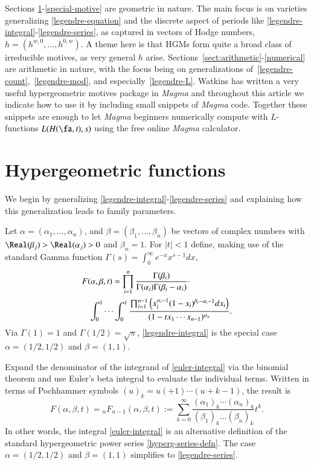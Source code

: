 \documentclass{notices}
\numberwithin{equation}{section}
\numberwithin{table}{section}
\numberwithin{figure}{section}
\begin{document}
Sections \ref{monodromy}-\ref{special-motive} are geometric in nature.  The main focus is 
on varieties generalizing \eqref{legendre-equation} 
and the discrete aspect of periods like \eqref{legendre-integral}-\eqref{legendre-series},
as captured in vectors of 
Hodge numbers, $h = (h^{w,0},\dots,h^{0,w})$.  
A theme here is that HGMs form quite a broad class of
irreducible motives, as very general $h$ arise.   
 Sections~\ref{sect:arithmetic}-\ref{numerical} are 
arithmetic in nature, with the focus being on
generalizations of~\eqref{legendre-count},~\eqref{legendre-mod},
and especially~\eqref{legendre-L}.   Watkins 
has written a very useful hypergeometric motives package \cite{Wat}
in {\em Magma} and throughout this article we indicate
how to use it by including small snippets of {\em Magma} code.
Together these snippets are enough to let {\em Magma}
beginners numerically compute with $L$-functions $L(H(\fa,t),s)$ using the
free online {\em Magma} calculator. 


\section{Hypergeometric functions}
\label{monodromy}
We begin by generalizing \eqref{legendre-integral}-\eqref{legendre-series} and explaining how
this generalization leads to family parameters.  

 Let $\alpha = (\alpha_1, \dots, \alpha_n)$, 
and $\beta = (\beta_1, \dots, \beta_n)$ be vectors of complex numbers
with $\Real(\beta_j)>\Real(\alpha_j)>0$ and $\beta_n=1$.  For $|t| < 1$ define, making use of the
standard Gamma function
$\Gamma(s) = \int_0^\infty e^{-x} x^{s-1} dx$, 
\begin{eqnarray}
\label{euler-integral}
\lefteqn{F(\alpha,\beta,t)=  \prod_{i=1}^n\frac{\Gamma(\beta_i)}{\Gamma(\alpha_i)\Gamma(\beta_i-\alpha_i)} \cdot} \\
&& \int_0^1\cdots\int_0^1  \frac{\prod_{i=1}^{n-1} \left( x_i^{\alpha_i-1}(1-x_i)^{\beta_i-\alpha_i-1}  dx_i \right)}{ (1-tx_1\cdots x_{n-1})^{\alpha_n}}. \nonumber
\end{eqnarray}
Via $\Gamma(1)=1$ and $\Gamma(1/2) = \sqrt{\pi}$,  \eqref{legendre-integral} is the special case $\alpha = (1/2,1/2)$ and $\beta=(1,1)$.

Expand the denominator of the integrand of \eqref{euler-integral} via the binomial theorem and use
Euler's beta integral to evaluate the individual terms.  Written in terms 
of Pochhammer symbols $(u)_k 
= u(+1) \cdots (u+k-1)$, the result is
\begin{equation}
\label{hyperg-series-defn}
F (\alpha,\beta,t) = {}_{n}F_{n-1} (\alpha,\beta,t):=
   \sum_{k = 0}^\infty \frac{(\alpha_1)_k \cdots (\alpha_n)_k}{(\beta_1)_k\dots
  (\beta_n)_k} t^k.
\end{equation}
In other words, the integral \eqref{euler-integral} is an alternative
definition of the standard hypergeometric power series \eqref{hyperg-series-defn}.
The case $\alpha = (1/2,1/2)$ and $\beta=(1,1)$ simplifies to \eqref{legendre-series}.
\end{document}
